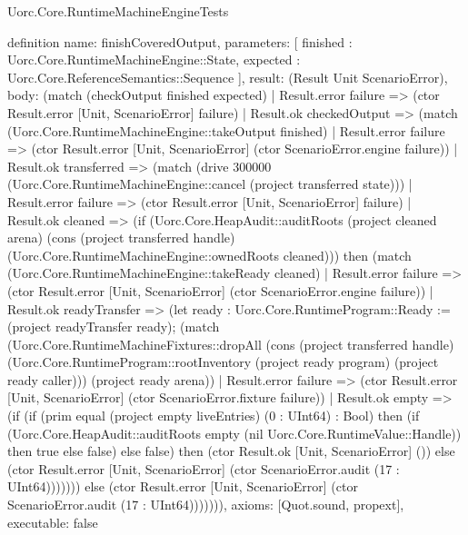 \begin{lexlean}{Uorc.Core.RuntimeMachineEngineTests}
\begin{semanticmodule}
definition{
  name: finishCoveredOutput,
  parameters: [
    finished : Uorc.Core.RuntimeMachineEngine::State,
    expected : Uorc.Core.ReferenceSemantics::Sequence
  ],
  result: (Result Unit ScenarioError),
  body: (match (checkOutput finished expected)
    | Result.error failure => (ctor Result.error [Unit, ScenarioError] failure)
    | Result.ok checkedOutput => (match (Uorc.Core.RuntimeMachineEngine::takeOutput finished)
      | Result.error failure => (ctor Result.error [Unit, ScenarioError] (ctor ScenarioError.engine failure))
      | Result.ok transferred => (match (drive 300000 (Uorc.Core.RuntimeMachineEngine::cancel (project transferred state)))
        | Result.error failure => (ctor Result.error [Unit, ScenarioError] failure)
        | Result.ok cleaned => (if (Uorc.Core.HeapAudit::auditRoots (project cleaned arena) (cons (project transferred handle) (Uorc.Core.RuntimeMachineEngine::ownedRoots cleaned))) then (match (Uorc.Core.RuntimeMachineEngine::takeReady cleaned)
          | Result.error failure => (ctor Result.error [Unit, ScenarioError] (ctor ScenarioError.engine failure))
          | Result.ok readyTransfer => (let ready : Uorc.Core.RuntimeProgram::Ready := (project readyTransfer ready); (match (Uorc.Core.RuntimeMachineFixtures::dropAll (cons (project transferred handle) (Uorc.Core.RuntimeProgram::rootInventory (project ready program) (project ready caller))) (project ready arena))
            | Result.error failure => (ctor Result.error [Unit, ScenarioError] (ctor ScenarioError.fixture failure))
            | Result.ok empty => (if (if (prim equal (project empty liveEntries) (0 : UInt64) : Bool) then (if (Uorc.Core.HeapAudit::auditRoots empty (nil Uorc.Core.RuntimeValue::Handle)) then true else false) else false) then (ctor Result.ok [Unit, ScenarioError] ()) else (ctor Result.error [Unit, ScenarioError] (ctor ScenarioError.audit (17 : UInt64))))))) else (ctor Result.error [Unit, ScenarioError] (ctor ScenarioError.audit (17 : UInt64))))))),
  axioms: [Quot.sound, propext],
  executable: false
}


\end{semanticmodule}
\end{lexlean}

